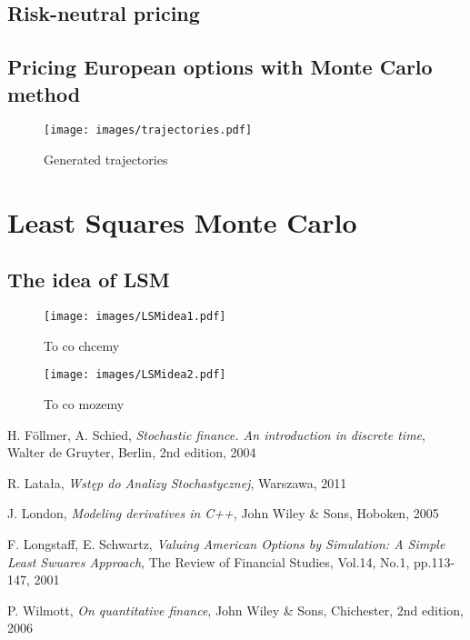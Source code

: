 \documentclass[a4paper,12pt, twoside]{article}
\theoremstyle{definition}
\theoremstyle{remark}
\begin{document}
\subsection{Risk-neutral pricing}
\subsection{Pricing European options with Monte Carlo method}
\begin{figure}
\centering
 \texttt{[image: images/trajectories.pdf]}
\caption{Generated trajectories}
\end{figure}



\newpage
\section{Least Squares Monte Carlo}
\subsection{The idea of LSM}
\begin{figure}[h]
\centering
 \texttt{[image: images/LSMidea1.pdf]}
\caption{To co chcemy}
\end{figure}
\begin{figure}
\centering
 \texttt{[image: images/LSMidea2.pdf]}
\caption{To co mozemy}
\end{figure}

\begin{thebibliography}{99}

H. F\"{o}llmer, A. Schied, \emph{Stochastic finance. An introduction in discrete time}, Walter de Gruyter, Berlin, 2nd edition, 2004

R. Latała, \emph{Wstęp do Analizy Stochastycznej}, Warszawa, 2011

J. London, \emph{Modeling derivatives in C++}, John Wiley \& Sons, Hoboken, 2005

F. Longstaff, E. Schwartz, \emph{Valuing American Options by Simulation: A Simple Least Swuares Approach}, The Review of Financial Studies, Vol.14, No.1, pp.113-147, 2001

P. Wilmott, \emph{On quantitative finance}, John Wiley \& Sons, Chichester, 2nd edition, 2006

\end{thebibliography}
\end{document}
